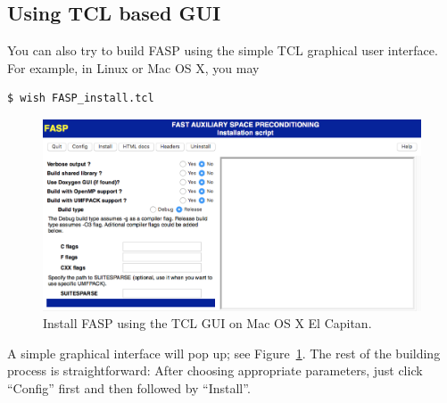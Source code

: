 \documentclass[11pt]{memoir}
\begin{document}
\subsection{Using TCL based GUI}
You can also try to build FASP using the simple TCL graphical user interface. For example, in Linux or Mac OS X, you may 
%
\begin{lstlisting}[numbers=none]
$ wish FASP_install.tcl
\end{lstlisting}
%
\begin{figure}[h!!] %
   \centering
   \includegraphics[width=\linewidth]{fig/install-fasp-gui.png} 
   \caption{Install FASP using the TCL GUI on Mac OS X El Capitan.}
   \label{fig:gui}
\end{figure}
%
A simple graphical interface will pop up; see Figure~\ref{fig:gui}. The rest of the building process is straightforward: After choosing appropriate parameters, just click ``Config'' first and then followed by ``Install''. 

\end{document}
